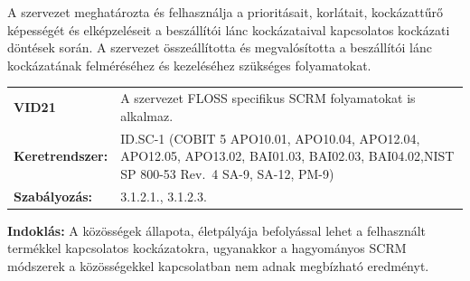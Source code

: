 \documentclass[12pt,magyar,a4paper,oneside]{scrreprt}
\begin{document}
A szervezet meghatározta és felhasználja a prioritásait, korlátait,
kockázattűrő képességét és elképzeléseit a beszállítói lánc
kockázataival kapcsolatos kockázati döntések során. A szervezet
összeállította és megvalósította a beszállítói lánc kockázatának
felméréséhez és kezeléséhez szükséges folyamatokat.

\begin{longtable}[]{@{}ll@{}}
\toprule
\endhead
\begin{minipage}[t]{0.16\columnwidth}\raggedright
\textbf{VID21}\strut
\end{minipage} & \begin{minipage}[t]{0.79\columnwidth}\raggedright
A szervezet FLOSS specifikus SCRM folyamatokat is alkalmaz.\strut
\end{minipage}\tabularnewline
\begin{minipage}[t]{0.16\columnwidth}\raggedright
\textbf{Keretrendszer:}\strut
\end{minipage} & \begin{minipage}[t]{0.79\columnwidth}\raggedright
ID.SC-1 (COBIT 5 APO10.01, APO10.04, APO12.04, APO12.05, APO13.02,
BAI01.03, BAI02.03, BAI04.02,NIST SP 800-53 Rev.~4 SA-9, SA-12,
PM-9)\strut
\end{minipage}\tabularnewline
\begin{minipage}[t]{0.16\columnwidth}\raggedright
\textbf{Szabályozás:}\strut
\end{minipage} & \begin{minipage}[t]{0.79\columnwidth}\raggedright
3.1.2.1., 3.1.2.3.\strut
\end{minipage}\tabularnewline
\bottomrule
\end{longtable}

\textbf{Indoklás: } A közösségek állapota, életpályája befolyással lehet
a felhasznált termékkel kapcsolatos kockázatokra, ugyanakkor a
hagyományos SCRM módszerek a közösségekkel kapcsolatban nem adnak
megbízható eredményt.
\end{document}
